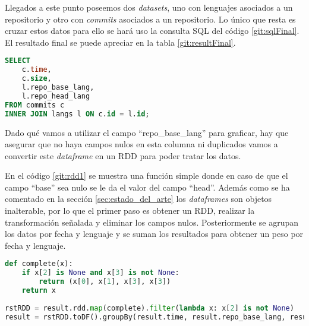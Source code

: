 Llegados a este punto poseemos dos \textit{datasets}, uno con lenguajes asociados a un repositorio y otro con \textit{commits} asociados a un repositorio. Lo único que resta es cruzar estos datos para ello se hará uso la consulta \gls{SQL} del código \ref{git:sqlFinal}. El resultado final se puede apreciar en la tabla \ref{git:resultFinal}.
\cleardoublepage
\begin{lstlisting}[label=git:sqlFinal,language=SQL,frame=single,caption={\gls{SQL} para cruzar datos de lenguajes y \textit{commits}.}]
SELECT 
	c.time,
	c.size,
	l.repo_base_lang, 
	l.repo_head_lang 
FROM commits c 
INNER JOIN langs l ON c.id = l.id;
\end{lstlisting}

Dado qué vamos a utilizar el campo ``repo\_base\_lang'' para graficar, hay que asegurar que no haya campos nulos en esta columna ni duplicados vamos a convertir este \textit{dataframe} en un \gls{RDD} para poder tratar los datos.

En el código \ref{git:rdd1} se muestra una función simple donde en caso de que el campo ``base'' sea nulo se le da el valor del campo ``head''. Además como se ha comentado en la sección \ref{sec:estado_del_arte} los \textit{dataframes} son objetos inalterable, por lo que el primer paso es obtener un \gls{RDD}, realizar la transformación señalada y eliminar los campos nulos. Posteriormente se agrupan los datos por fecha y lenguaje y se suman los resultados para obtener un peso por fecha y lenguaje.

\begin{lstlisting}[label=git:rdd1,language=python,frame=single,caption={Transformaciones del \gls{RDD} para asegurar la calidad del dato.}]
def complete(x):
	if x[2] is None and x[3] is not None:
		return (x[0], x[1], x[3], x[3])
	return x
	
rstRDD = result.rdd.map(complete).filter(lambda x: x[2] is not None)
result = rstRDD.toDF().groupBy(result.time, result.repo_base_lang, result.size).sum()
\end{lstlisting}

